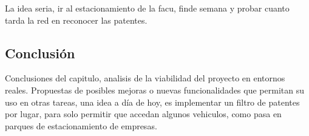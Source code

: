 La idea seria, ir al estacionamiento de la facu, finde semana y probar cuanto tarda la red en reconocer las patentes.

\subsection{Conclusión}

Conclusiones del capitulo, analisis de la viabilidad del proyecto en entornos reales. Propuestas de posibles mejoras o nuevas funcionalidades que permitan su uso en otras tareas, una idea a día de hoy, es implementar un filtro de patentes por lugar, para solo permitir que accedan algunos vehiculos, como pasa en parques de estacionamiento de empresas.